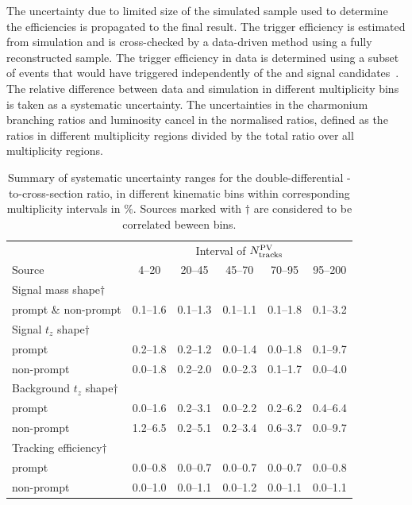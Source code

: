 \documentclass[12pt,a4paper]{article}
\begin{document}
The uncertainty due to limited size of the simulated sample used to determine the efficiencies is propagated to the final result. The trigger efficiency is estimated from simulation and is cross-checked by a data-driven method using a fully reconstructed sample. The trigger efficiency in data is determined using a subset of events that would have triggered independently of the \jpsi and \psitwos signal candidates~\cite{LHCb-DP-2012-004}. The relative difference between data and simulation in different multiplicity bins is taken as a systematic uncertainty.
The uncertainties in the charmonium branching ratios and luminosity cancel in the normalised ratios, defined as the ratios in different multiplicity regions divided by the total ratio over all multiplicity regions.
\begin{table}[!tbp]
  \centering
	\caption{Summary of systematic uncertainty ranges for the double-differential \psitwos-to-\jpsi cross-section ratio, in different kinematic bins within corresponding multiplicity intervals in $\%$. Sources marked with $\dagger$ are considered to be correlated beween bins.}
\begin{center}
  \begin{tabular}{l|ccccc}
    \hline
    & \multicolumn{5}{c}{Interval of $N_{\rm tracks}^{\rm PV}$}\\
    Source &  4--20 & 20--45  & 45--70   & 70--95   & 95--200   \\ \hline
    Signal mass shape$\dagger$ & & & & &  \\
    prompt \& non-prompt & 0.1--1.6 & 0.1--1.3 & 0.1--1.1 & 0.1--1.8 & 0.1--3.2 \\ \hline
    Signal $t_z$ shape$\dagger$  & & & & &  \\
    prompt & 0.2--1.8 & 0.2--1.2 & 0.0--1.4 & 0.0--1.8 & 0.1--9.7 \\ 
    non-prompt & 0.0--1.8 & 0.2--2.0 & 0.0--2.3 & 0.1--1.7 & 0.0--4.0 \\ \hline
    Background $t_z$ shape$\dagger$  & & & & &  \\
    prompt & 0.0--1.6 & 0.2--3.1 & 0.0--2.2 & 0.2--6.2 & 0.4--6.4 \\
    non-prompt & 1.2--6.5 & 0.2--5.1 & 0.2--3.4 & 0.6--3.7 & 0.0--9.7 \\ \hline
    Tracking efficiency$\dagger$ & & & & &  \\
    prompt & 0.0--0.8 & 0.0--0.7 & 0.0--0.7 & 0.0--0.7 & 0.0--0.8 \\
    non-prompt & 0.0--1.0 & 0.0--1.1 & 0.0--1.2 & 0.0--1.1 & 0.0--1.1 \\ \hline

\end{tabular}
\end{center}
\end{table}
\end{document}

